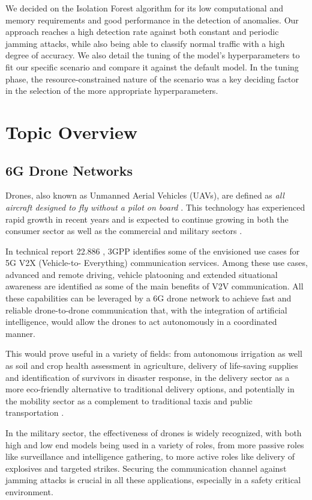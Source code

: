 \documentclass[futureinternet,article,submit,pdftex,moreauthors]{Definitions/mdpi}
\begin{document}
We decided on the Isolation Forest algorithm for its low computational and memory requirements and good performance in the detection of anomalies.
Our approach reaches a high detection rate against both constant and periodic jamming attacks, while also being able to classify normal traffic with a high degree of accuracy. We also detail the tuning of the model's hyperparameters to fit our specific scenario and compare it 
against the default model. In the tuning phase, the resource-constrained nature of the scenario was a key deciding factor in the selection of the more appropriate hyperparameters.

\section{Topic Overview}

\subsection{6G Drone Networks}

Drones, also known as Unmanned Aerial Vehicles (UAVs), are defined as \textit{all aircraft designed to fly
without a pilot on board} \cite{DronesEC}. This technology has experienced rapid growth in recent years and is expected to 
continue growing in both the consumer sector as well as the commercial and military sectors \cite{DronesStatisticsLaricchia}.

In technical report 22.886 \cite{5GV2XSultan}, 3GPP identifies some of the envisioned use cases for 5G V2X (Vehicle-to-
Everything) communication services. Among these use cases, advanced and remote driving, vehicle platooning and extended situational awareness are identified as some of the main benefits
of V2V communication. All these capabilities can be leveraged by a 6G drone network to achieve fast and reliable drone-to-drone communication that, with the integration of artificial intelligence, 
would allow the drones to act autonomously in a coordinated manner. 

This would prove useful in a variety of fields: from autonomous irrigation as well as soil and crop health assessment in agriculture, 
delivery of life-saving supplies and identification of survivors in disaster response, in the delivery sector as a more eco-friendly alternative to traditional 
delivery options, and potentially in the mobility sector as a complement to traditional taxis and public transportation \cite{DroneCommHassija}. 

In the military sector, the effectiveness of drones is widely recognized, with both high and low end models being used in a variety of roles, from more passive roles like surveillance and intelligence gathering, to more active roles like
delivery of explosives and targeted strikes. Securing the communication channel against jamming attacks is crucial in all these applications, especially in a safety critical environment. 
\end{document}
